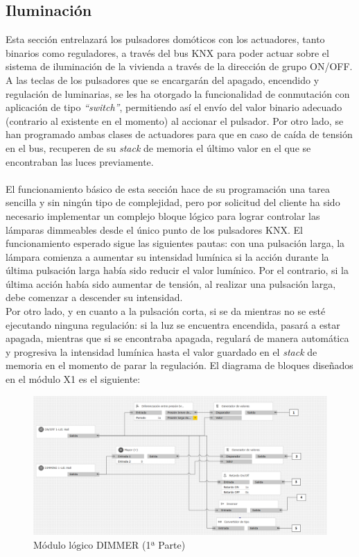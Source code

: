 \subsection{Iluminación} Esta sección entrelazará los pulsadores domóticos con los actuadores, tanto binarios como reguladores, a través del bus KNX para poder actuar sobre el sistema de iluminación de la vivienda a través de la dirección de grupo ON/OFF. A las teclas de los pulsadores que se encargarán del apagado, encendido y regulación de luminarias, se les ha otorgado la funcionalidad de conmutación con aplicación de tipo \textit {“switch”}, permitiendo así el envío del valor binario adecuado (contrario al existente en el momento) al accionar el pulsador. Por otro lado, se han programado ambas clases de actuadores para que en caso de caída de tensión en el bus, recuperen de su \textit {stack} de memoria el último valor en el que se encontraban las luces previamente. \\\\
El funcionamiento básico de esta sección hace de su programación una tarea sencilla y sin ningún tipo de complejidad, pero por solicitud del cliente ha sido necesario implementar un complejo bloque lógico para lograr controlar las lámparas dimmeables desde el único punto de los pulsadores KNX. El funcionamiento esperado sigue las siguientes pautas: con una pulsación larga, la lámpara comienza a aumentar su intensidad lumínica si la acción durante la última pulsación larga había sido reducir el valor lumínico. Por el contrario, si la última acción había sido aumentar de tensión, al realizar una pulsación larga, debe comenzar a descender su intensidad. \\
Por otro lado, y en cuanto a la pulsación corta, si se da mientras no se esté ejecutando ninguna regulación: si la luz se encuentra encendida, pasará a estar apagada, mientras que si se encontraba apagada, regulará de manera automática y progresiva la intensidad lumínica hasta el valor guardado en el \textit {stack} de memoria en el momento de parar la regulación.
\newpage
 El diagrama de bloques diseñados en el módulo X1 es el siguiente:
 \begin{center}
\begin{figure}[H]
\includegraphics[width=1.05\textwidth]{figures/log_dimm_izq.png}   
\caption{Módulo lógico DIMMER (1ª Parte)}
\label{fig:log_dimm_izq}
\end{figure}
\end{center}
